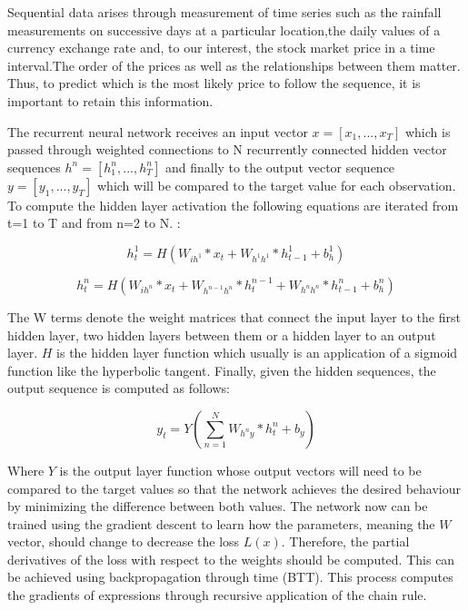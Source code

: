 Sequential data arises through measurement of time series such as the rainfall measurements on successive days at a particular location,the daily values of a currency exchange rate and, to our interest, the stock market price in a time interval.The order of the prices as well as the relationships between them matter. Thus, to predict which is the most likely price to follow the sequence, it is important to retain this information.

The recurrent neural network receives an input vector $x=[x_1,...,x_T]$ which is passed through weighted connections to N recurrently connected hidden vector sequences $h^n=[h_1^n,...,h_T^n]$ and finally to the output vector sequence $y=[y_1,...,y_T]$ which will be compared to the target value for each observation. To compute the hidden layer activation the following equations are iterated from t=1 to T and from n=2 to N. \cite{graves2013generating}:

\begin{equation} \label{eq:hidden1}
h_t^1= H( W_{ih^1} * x_t + W_{h^1 h^1}*h^1_{t-1} + b^1_h)
\end{equation}

\begin{equation} \label{eq:hidden}
h_t^n= H(W_{ih^n} * x_t + W_{h^{n-1}  h^n} * h^{n-1}_t +W_{h^n h^n} * h^n_{t-1}+ b^n_h)
\end{equation}

The W terms denote the weight matrices that connect the input layer to the first hidden layer, two hidden layers between them or a hidden layer to an output layer. $H$ is the hidden layer function which usually is an application of a sigmoid function like the hyperbolic tangent. Finally, given the hidden sequences, the output sequence is computed as follows:

\begin{equation} \label{eq:output}
y_t=Y(\sum_{n=1}^{N} W_{h^{n}y} * h^n_t + b_y)
\end{equation}

Where $Y$ is the output layer function whose output vectors will need to be compared to the target values so that the network achieves the desired behaviour by minimizing the difference between both values.
The network now can be trained using the gradient descent to learn how the parameters, meaning the $W$ vector, should change to decrease the loss  $L(x)$. Therefore, the partial derivatives of the loss with respect to the weights should be computed. This can be achieved using backpropagation through time (BTT). This process computes the gradients of expressions through recursive application of the chain rule.

